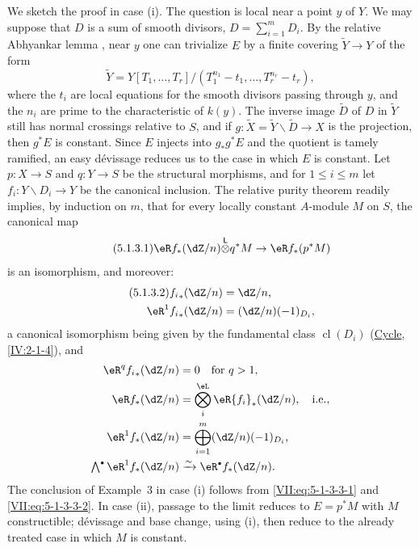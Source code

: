 \documentclass[12pt,oneside,english]{smfbook}
\DeclareMathOperator{\cl}{cl}
\newcounter{char}
\newcommand{\iso}{\xrightarrow\sim}
\newcommand{\lotimes}{{\overset{\mathsf{L}}{\otimes}}}
\renewcommand{\setminus}{\smallsetminus}
\let\oldbullet\bullet
\renewcommand{\bullet}{\textnormal{\tiny$\oldbullet$}}
\begin{document}
We sketch the proof in case (i). The question is local near a point $y$ of $Y$. We may suppose that $D$ is a sum of smooth divisors, $D=\sum_{i=1}^mD_i$. By the relative Abhyankar lemma \cite[XIII, 5.5]{sga1}, near $y$ one can trivialize $E$ by a finite covering $\widetilde Y\to Y$ of the form
\[
  \widetilde Y
  =Y[T_1,\dots,T_r]/(T_1^{n_1}-t_1,\dots,T_r^{n_r}-t_r),
\]
where the $t_i$ are local equations for the smooth divisors passing through $y$, and the $n_i$ are prime to the characteristic of $k(y)$. The inverse image $\widetilde D$ of $D$ in $\widetilde Y$ still has normal crossings relative to $S$, and if $g:\widetilde X=\widetilde Y\setminus\widetilde D\to X$ is the projection, then $g^\ast E$ is constant. Since $E$ injects into $g_\ast g^\ast E$ and the quotient is tamely ramified, an easy dévissage reduces us to the case in which $E$ is constant. Let $p:X\to S$ and $q:Y\to S$ be the structural morphisms, and for $1\leqslant i\leqslant m$ let $f_i:Y\setminus D_i\to Y$ be the canonical inclusion. The relative purity theorem \cite[XVI, 3.7]{sga4} readily implies, by induction on $m$, that for every locally constant $A$-module $M$ on $S$, the canonical map
\begin{equation*}\tag{5.1.3.1}\label{VII:eq:5-1-3-3-1} %
  \eR f_\ast (\dZ/n)\lotimes q^\ast M\to \eR f_\ast (p^\ast M)
\end{equation*}
is an isomorphism, and moreover:
\begin{align*}\tag{5.1.3.2}\label{VII:eq:5-1-3-3-2}
  {f_i}_\ast(\dZ/n) &= \dZ/n \text{,} \\
  \eR^1 {f_i}_\ast (\dZ/n) &= (\dZ/n)(-1)_{D_i} \text{,}
\end{align*}
a canonical isomorphism being given by the fundamental class $\cl(D_i)$ (\hyperref[IV]{Cycle}, \ref{IV:2-1-4}), and
\begin{align*}
  \eR^q {f_i}_\ast(\dZ/n) &= 0\quad\text{for $q>1$}, \\
  \eR f_\ast (\dZ/n) &= \bigotimes_i^\eL \eR {f_i}_\ast (\dZ/n),
    \quad\text{i.e.}, \\
  \eR^1 f_\ast(\dZ/n) &= \bigoplus_{i=1}^m (\dZ/n)(-1)_{D_i} \text{,} \\
  \textstyle\bigwedge^\bullet \eR^1 f_\ast(\dZ/n) &\iso \eR^\bullet f_\ast (\dZ/n) \text{.}
\end{align*}
The conclusion of Example~3 in case (i) follows from \eqref{VII:eq:5-1-3-3-1} and \eqref{VII:eq:5-1-3-3-2}. In case (ii), passage to the limit reduces to $E=p^\ast M$ with $M$ constructible; dévissage and base change, using (i), then reduce to the already treated case in which $M$ is constant.
\end{document}
